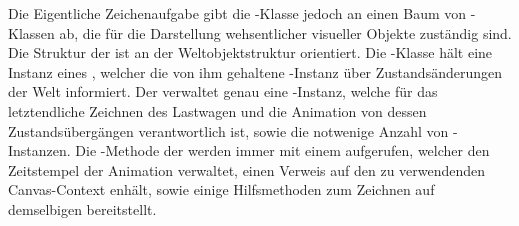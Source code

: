 Die Eigentliche Zeichenaufgabe gibt die -Klasse jedoch an einen Baum von -Klassen ab, die für die Darstellung wehsentlicher visueller Objekte zuständig sind. Die Struktur der  ist an der Weltobjektstruktur  orientiert. Die -Klasse hält eine Instanz eines , welcher die von ihm gehaltene -Instanz über Zustandsänderungen der Welt informiert. Der  verwaltet genau eine -Instanz, welche für das letztendliche Zeichnen des Lastwagen und die Animation von dessen Zustandsübergängen verantwortlich ist, sowie die notwenige Anzahl von -Instanzen. Die -Methode der  werden immer mit einem  aufgerufen, welcher den Zeitstempel der Animation verwaltet, einen Verweis auf den zu verwendenden Canvas-Context enhält, sowie einige Hilfsmethoden zum Zeichnen auf demselbigen bereitstellt.

